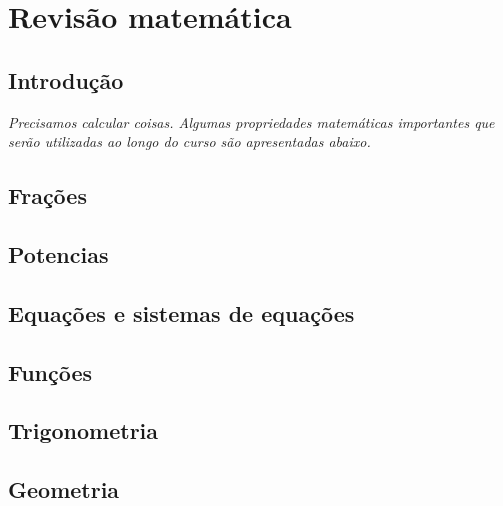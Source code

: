 \chapter{Revisão matemática}
\label{Chap:Review}



\section{Introdução}

{\it
Precisamos calcular coisas. Algumas propriedades matemáticas importantes que serão utilizadas ao longo do curso são apresentadas abaixo.
}

\section{Frações}

\section{Potencias}

\section{Equações e sistemas de equações}

\section{Funções}

\section{Trigonometria}

\section{Geometria}

